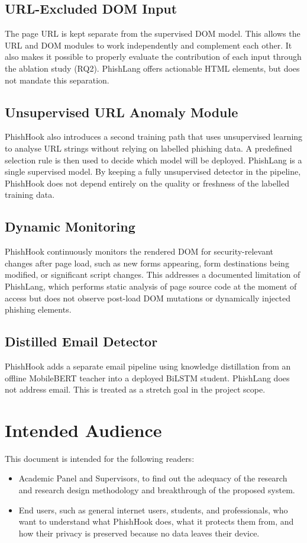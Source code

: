 \documentclass{FastFyp}
\begin{document}
\subsection{URL-Excluded DOM Input}
The page URL is kept separate from the supervised DOM model. This allows the URL and DOM modules to work independently and complement each other. It also makes it possible to properly evaluate the contribution of each input through the ablation study (RQ2). PhishLang offers actionable HTML elements, but does not mandate this separation.

\subsection{Unsupervised URL Anomaly Module}
PhishHook also introduces a second training path that uses unsupervised learning to analyse URL strings without relying on labelled phishing data. A predefined selection rule is then used to decide which model will be deployed. PhishLang is a single supervised model. By keeping a fully unsupervised detector in the pipeline, PhishHook does not depend entirely on the quality or freshness of the labelled training data.

\subsection{Dynamic Monitoring}
PhishHook continuously monitors the rendered DOM for security-relevant changes after page load, such as new forms appearing, form destinations being modified, or significant script changes. This addresses a documented limitation of PhishLang, which performs static analysis of page source code at the moment of access but does not observe post-load DOM mutations or dynamically injected phishing elements.

\subsection{Distilled Email Detector}
PhishHook adds a separate email pipeline using knowledge distillation from an offline MobileBERT teacher into a deployed BiLSTM student. PhishLang does not address email. This is treated as a stretch goal in the project scope.

\section{Intended Audience}
This document is intended for the following readers:
\begin{itemize}
    \item Academic Panel and Supervisors, to find out the adequacy of the research and research design
    methodology and breakthrough of the proposed system.

    \item End users, such as general internet users, students, and professionals, who want to understand what PhishHook does, what it protects them from, and how their privacy is preserved because no data leaves their device.
\end{itemize}
\end{document}
